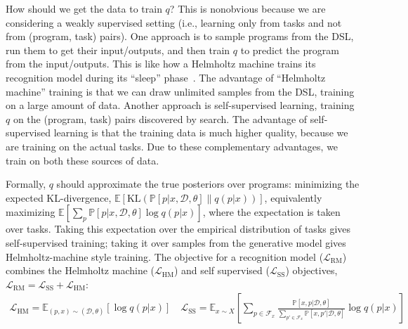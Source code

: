 \documentclass{article}
\newcommand{\system}{\textsc{CoCoSea}~}
\newcommand{\expect}{\mathds{E}} %
\newcommand{\probability}{\mathds{P}} %
\begin{document}
How should we get the data to train $q$?
This is nonobvious  because we are considering a weakly supervised setting (i.e., learning only from tasks and not from (program, task) pairs).
One approach is to sample programs from the DSL,
run them to get their input/outputs,
and then train $q$ to predict the program from the input/outputs.
This is like how a Helmholtz machine
trains its recognition model during its ``sleep'' phase~\cite{dayan1995helmholtz}.
The advantage of ``Helmholtz machine'' training is that
we can draw unlimited samples from the DSL,
training on a large amount of data.
Another approach is
 self-supervised learning,
training $q$ on the (program, task)
pairs discovered by search.
The advantage of self-supervised learning
is that the training data is much higher quality,
because we are training on the actual tasks.
Due to these complementary advantages,
we train on both these sources of data.

Formally, $q$ should approximate the true posteriors over programs: minimizing the expected KL-divergence, $  \expect\left[\text{KL}\left(\probability[p|x,\mathcal{D},\theta]\|q(p|x) \right) \right]$,
 equivalently maximizing $  \expect[\sum_p\probability[p|x,\mathcal{D},\theta]\log q(p|x) ]$,
 where the expectation is taken over tasks. Taking this expectation over the empirical distribution of tasks gives self-supervised training; taking it over samples from the generative model gives  Helmholtz-machine style training.
 The  objective for a recognition model ($\mathcal{L}_{\text{RM}}$) combines the Helmholtz machine ($\mathcal{L}_{\text{HM}}$) and self supervised ($\mathcal{L}_{\text{SS}}$) objectives, $\mathcal{L}_{\text{RM}} = \mathcal{L}_\text{SS} + \mathcal{L}_\text{HM}$:
\begin{align}\nonumber
\mathcal{L}_{\text{HM}} = \expect_{(p,x)\sim(\mathcal{D},\theta) }\left[\log q(p|x)\right]\quad
\mathcal{L}_{\text{SS}} = \expect_{x\sim X}\left[\sum_{p\in \mathcal{F}_x}
  \frac{\probability\left[x,p|\mathcal{D},\theta \right]}{\sum_{p'\in \mathcal{F}_x}\probability\left[x,p'|\mathcal{D},\theta \right]}\log q(p|x)\right]
\end{align}

\end{document}
